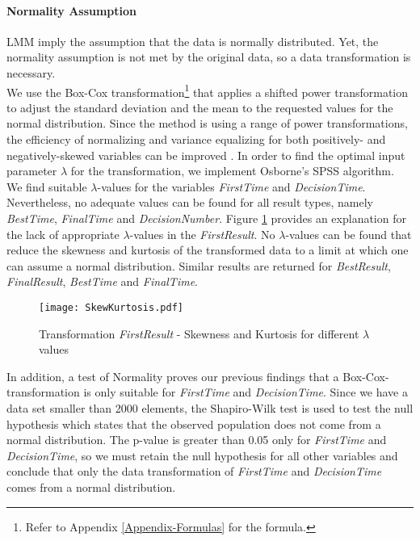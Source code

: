 \paragraph{Normality Assumption}
\ac{LMM} imply the assumption that the data is normally distributed. Yet, the normality assumption is not met by the original data, so a data transformation is necessary.\\
We use the Box-Cox transformation\footnote{Refer to Appendix \ref{Appendix-Formulas} for the formula.} \citep{Sakia1992} that applies a shifted power transformation to adjust the standard deviation and the mean to the requested values for the normal distribution. Since the method is using a range of power transformations, the efficiency of normalizing and variance equalizing for both positively- and negatively-skewed variables can be improved \citep{Osborne2010}. In order to find the optimal input parameter $\lambda$ for the transformation, we implement Osborne's SPSS algorithm. \\
We find suitable $\lambda$-values for the variables \textit{FirstTime} and \textit{DecisionTime}. Nevertheless, no adequate values can be found for all result types, namely \textit{BestTime}, \textit{FinalTime} and \textit{DecisionNumber}.
Figure \ref{fig:SkewKurtosis} provides an explanation for the lack of appropriate $\lambda$-values in the \textit{FirstResult}. No $\lambda$-values can be found that reduce the skewness and kurtosis of the transformed data to a limit at which one can assume a normal distribution. Similar results are returned for \textit{BestResult}, \textit{FinalResult}, \textit{BestTime} and \textit{FinalTime}.
\begin{figure}[htbp] %
\begin{center} 
\texttt{[image: SkewKurtosis.pdf]}
  \caption{Transformation \textit{FirstResult} - Skewness and Kurtosis for different $\lambda$ values}
    \label{fig:SkewKurtosis} 
\end{center}
\end{figure}
In addition, a test of Normality proves our previous findings that a Box-Cox-transformation is only suitable for \textit{FirstTime} and \textit{DecisionTime}. Since we have a data set smaller than 2000 elements, the Shapiro-Wilk test \citep{Shapiro1965} is used to test the null hypothesis which states that the observed population does not come from a normal distribution. The p-value is greater than 0.05 only for \textit{FirstTime} and \textit{DecisionTime}, so we must retain the null hypothesis for all other variables and conclude that only the data transformation of \textit{FirstTime} and \textit{DecisionTime} comes from a normal distribution.

